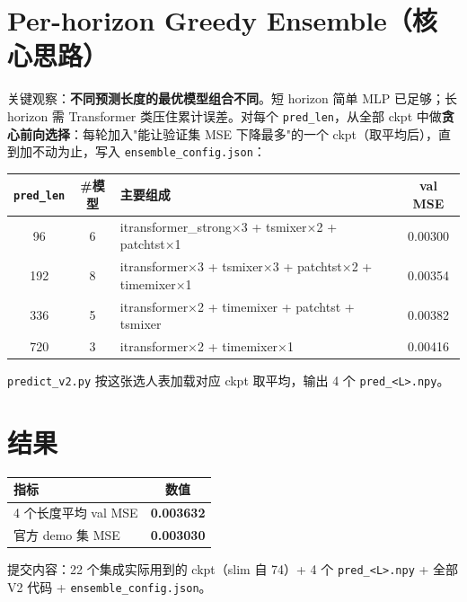\documentclass[10pt,a4paper]{ctexart}
\begin{document}
\section{Per-horizon Greedy Ensemble（核心思路）}
关键观察：\textbf{不同预测长度的最优模型组合不同}。短 horizon 简单 MLP 已足够；长 horizon 需 Transformer 类压住累计误差。对每个 \texttt{pred\_len}，从全部 ckpt 中做\textbf{贪心前向选择}：每轮加入"能让验证集 MSE 下降最多"的一个 ckpt（取平均后），直到加不动为止，写入 \texttt{ensemble\_config.json}：
\vspace{-0.3em}
\begin{center}\small
\begin{tabular}{cclc}
\toprule
\texttt{pred\_len} & \#模型 & 主要组成 & val MSE \\
\midrule
96  & 6 & itransformer\_strong×3 + tsmixer×2 + patchtst×1                  & 0.00300 \\
192 & 8 & itransformer×3 + tsmixer×3 + patchtst×2 + timemixer×1            & 0.00354 \\
336 & 5 & itransformer×2 + timemixer + patchtst + tsmixer                  & 0.00382 \\
720 & 3 & itransformer×2 + timemixer×1                                      & 0.00416 \\
\bottomrule
\end{tabular}
\end{center}
\vspace{-0.3em}
\texttt{predict\_v2.py} 按这张选人表加载对应 ckpt 取平均，输出 4 个 \texttt{pred\_<L>.npy}。

\section{结果}
\vspace{-0.3em}
\begin{center}\small
\begin{tabular}{lc}
\toprule
指标 & 数值 \\
\midrule
4 个长度平均 val MSE & \textbf{0.003632} \\
官方 demo 集 MSE     & \textbf{0.003030} \\
\bottomrule
\end{tabular}
\end{center}
\vspace{-0.3em}
提交内容：22 个集成实际用到的 ckpt（slim 自 74）+ 4 个 \texttt{pred\_<L>.npy} + 全部 V2 代码 + \texttt{ensemble\_config.json}。
\end{document}
